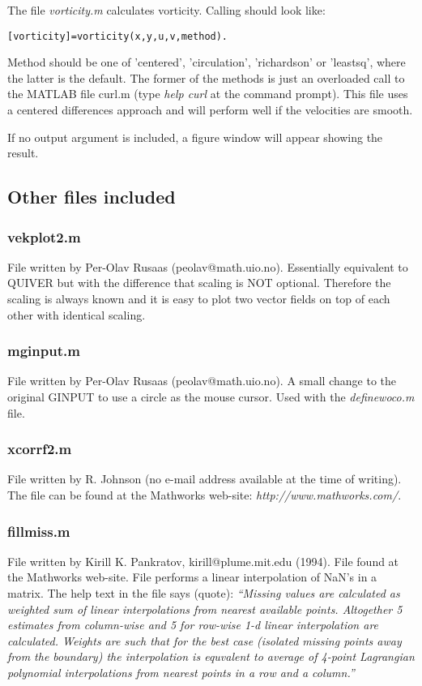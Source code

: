 \documentclass{book}
\begin{document}
The file {\em vorticity.m} calculates vorticity. Calling should look
like:
\begin{verbatim}
[vorticity]=vorticity(x,y,u,v,method).
\end{verbatim}
Method should be one of 'centered', 'circulation', 'richardson' or
'leastsq', where the latter is the default. The former of the methods is
just an overloaded call to the MATLAB file curl.m (type {\em help curl}
at the command prompt). This file uses a centered differences approach
and will perform well if the velocities are smooth. 

If no output argument is included, a figure window will appear showing
the result.

\subsection{Other files included}

\subsubsection{vekplot2.m}
File written by Per-Olav Rusaas (peolav@math.uio.no). Essentially
equivalent to QUIVER but with the difference that scaling is NOT
optional. Therefore the scaling is always known and it is easy to plot 
two vector fields on top of each other with identical scaling.

\subsubsection{mginput.m}
File written by Per-Olav Rusaas (peolav@math.uio.no). A small change
to the original GINPUT to use a circle as the mouse cursor. Used with
the {\em definewoco.m} file.

\subsubsection{xcorrf2.m}
File written by R. Johnson (no e-mail address available at the time of
writing). The file can be found at the Mathworks web-site: {\em
http://www.mathworks.com/}.

\subsubsection{fillmiss.m}
File written by Kirill K. Pankratov, kirill@plume.mit.edu (1994). File
found at the Mathworks web-site. File performs a linear interpolation
of NaN's in a matrix. The help text in the file says (quote): {\em
``Missing values are calculated as weighted sum of linear
interpolations from nearest available points.  Altogether 5 estimates
from column-wise and 5 for row-wise 1-d linear interpolation are
calculated.  Weights are such that for the best case (isolated missing
points away from the boundary) the interpolation is equvalent to
average of 4-point Lagrangian polynomial interpolations from nearest
points in a row and a column.''}
\end{document}
